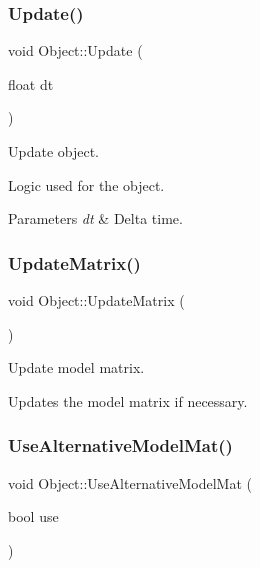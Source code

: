 \subsubsection{\texorpdfstring{Update()}{Update()}}
{\footnotesize\ttfamily void Object\+::\+Update (\begin{DoxyParamCaption}\item[{float}]{dt }\end{DoxyParamCaption})\hspace{0.3cm}{\ttfamily [virtual]}}



Update object. 

Logic used for the object. 
\begin{DoxyParams}{Parameters}
{\em dt} & Delta time. \\
\hline
\end{DoxyParams}
\mbox{\label{class_object_af08c7cf7a01b230d6967551c52bdff63}} 
\subsubsection{\texorpdfstring{Update\+Matrix()}{UpdateMatrix()}}
{\footnotesize\ttfamily void Object\+::\+Update\+Matrix (\begin{DoxyParamCaption}{ }\end{DoxyParamCaption})\hspace{0.3cm}{\ttfamily [protected]}}



Update model matrix. 

Updates the model matrix if necessary. \mbox{\label{class_object_a5930b30196790ae109835e4f24a85b29}} 
\subsubsection{\texorpdfstring{Use\+Alternative\+Model\+Mat()}{UseAlternativeModelMat()}}
{\footnotesize\ttfamily void Object\+::\+Use\+Alternative\+Model\+Mat (\begin{DoxyParamCaption}\item[{bool}]{use }\end{DoxyParamCaption})}



